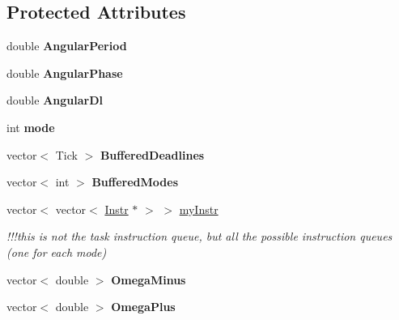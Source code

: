 \subsection*{Protected Attributes}
\begin{DoxyCompactItemize}
\item 
double {\bfseries Angular\+Period}\hypertarget{classRTSim_1_1AVRTask_a2082057750f55aa68f8d42a03a29d9f2}{}\label{classRTSim_1_1AVRTask_a2082057750f55aa68f8d42a03a29d9f2}

\item 
double {\bfseries Angular\+Phase}\hypertarget{classRTSim_1_1AVRTask_a7a365a846ad579302d52a409bc93e998}{}\label{classRTSim_1_1AVRTask_a7a365a846ad579302d52a409bc93e998}

\item 
double {\bfseries Angular\+Dl}\hypertarget{classRTSim_1_1AVRTask_aa856cbdfdac065558ee8b38ce51ef230}{}\label{classRTSim_1_1AVRTask_aa856cbdfdac065558ee8b38ce51ef230}

\item 
int {\bfseries mode}\hypertarget{classRTSim_1_1AVRTask_af8a45acd6db4e082f538ee70429dc027}{}\label{classRTSim_1_1AVRTask_af8a45acd6db4e082f538ee70429dc027}

\item 
vector$<$ Tick $>$ {\bfseries Buffered\+Deadlines}\hypertarget{classRTSim_1_1AVRTask_adc1e1fc065733a606277cbd22cc784c4}{}\label{classRTSim_1_1AVRTask_adc1e1fc065733a606277cbd22cc784c4}

\item 
vector$<$ int $>$ {\bfseries Buffered\+Modes}\hypertarget{classRTSim_1_1AVRTask_a37997c40458744d9a48f1e3fcdd62464}{}\label{classRTSim_1_1AVRTask_a37997c40458744d9a48f1e3fcdd62464}

\item 
vector$<$ vector$<$ \hyperlink{classRTSim_1_1Instr}{Instr} $\ast$ $>$ $>$ \hyperlink{classRTSim_1_1AVRTask_ac6e66a4eb60560c680a939497db5dc03}{my\+Instr}\hypertarget{classRTSim_1_1AVRTask_ac6e66a4eb60560c680a939497db5dc03}{}\label{classRTSim_1_1AVRTask_ac6e66a4eb60560c680a939497db5dc03}

\begin{DoxyCompactList}\small\item\em !!!this is not the task instruction queue, but all the possible instruction queues (one for each mode) \end{DoxyCompactList}\item 
vector$<$ double $>$ {\bfseries Omega\+Minus}\hypertarget{classRTSim_1_1AVRTask_ab2d030d7e5265bc7f4481668c3b61c56}{}\label{classRTSim_1_1AVRTask_ab2d030d7e5265bc7f4481668c3b61c56}

\item 
vector$<$ double $>$ {\bfseries Omega\+Plus}\hypertarget{classRTSim_1_1AVRTask_aa13e909562fd421d8440343ea99838fe}{}\label{classRTSim_1_1AVRTask_aa13e909562fd421d8440343ea99838fe}

\end{DoxyCompactItemize}
